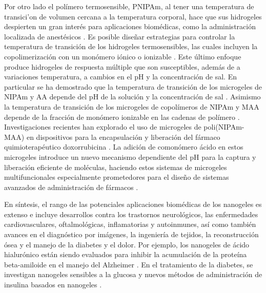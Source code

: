 
Por otro lado el pol\'imero termosensible, PNIPAm, al tener una temperatura de transici'on de volumen cercana a la temperatura corporal, hace que sus hidrogeles despierten un gran inter\'es para aplicaciones biom\'edicas, como la administraci\'on localizada de anest\'esicos \cite{Guan2011, indulekha2016thermoresponsive}. %
Es posible dise\~nar estrategias para controlar la temperatura de transici\'on de los hidrogeles termosensibles, las cuales incluyen la copolimerizaci\'on con un mon\'omero i\'onico o ionizable \cite{Cai2007,Macchione2019, Hirose1987,Lopez2020}.
Este \'ultimo enfoque produce hidrogeles de respuesta m\'ultiple que son susceptibles, adem\'as de a variaciones temperatura, a cambios en el pH y la concentraci\'on de sal.
En particular se ha demostrado que la temperatura de transici\'on de los microgeles de NIPAm y AA depende del pH de la soluci\'on y la concentraci\'on de sal \cite{Morris1997, Jones2000,Bradley2005,Begum2016}.
Asimismo la temperatura de transici\'on de los  microgeles de copol\'imeros de NIPAm y MAA \cite{Dowding2000,Hoare2004,Giussi2015} depende de la fracci\'on de mon\'omero ionizable en las cadenas de pol\'imero \cite{Morris1997,Jones2000, Hoare2004, Bradley2005, Lee2008,Wong2009,Hamzavi2016}.
Investigaciones recientes han explorado el uso de microgeles de poli(NIPAm-MAA) en dispositivos para la encapsulaci\'on y liberaci\'on del f\'armaco quimioterap\'eutico doxorrubicina \cite{Giussi2020, MartinezMoro2020, Pergushov2020}. La adici\'on de comon\'omero \'acido en estos microgeles introduce un nuevo mecanismo dependiente del pH para la captura y liberaci\'on eficiente de mol\'eculas, haciendo estos sistemas de microgeles multifuncionales especialmente prometedores para el dise\~no de sistemas avanzados de administraci\'on de f\'armacos \cite{Liu2017}.

En s\'intesis, el rango de las potenciales aplicaciones biom\'edicas de los nanogeles es extenso e incluye desarrollos contra los trastornos neurol\'ogicos, las enfermedades cardiovasculares, oftalmol\'ogicas, inflamatorias y autoinmunes, as\'i como tambi\'en avances en el diagn\'ostico por im\'agenes, la ingenier\'ia de tejidos, la reconstrucci\'on \'osea y el manejo de la diabetes y el dolor. Por ejemplo, los nanogeles de \'acido hialur\'onico est\'an siendo evaluados para inhibir la acumulaci\'on de la prote\'ina beta-amiloide en el manejo del Alzheimer \cite{jiang2018nanogels}. En el tratamiento de la diabetes, se investigan nanogeles sensibles a la glucosa \cite{wu2010multifunctional} y nuevos m\'etodos de administraci\'on de insulina basados en nanogeles \cite{nolan2004thermally}.

